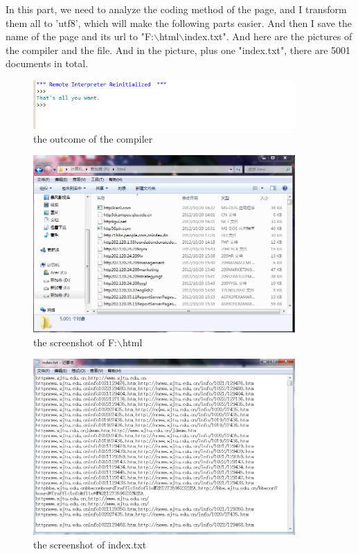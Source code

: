 \documentclass{article}
\begin{document}
In this part, we need to analyze the coding method of the page, and I transform them all to 'utf8', which will make the following parts easier. And then I save the name of the page and its url to "F:$\backslash$html$\backslash$index.txt". And here are the pictures of the compiler and the file. And in the picture, plus one "index.txt", there are 5001 documents in total.\\
\begin{figure}[htbp]
\centering
\includegraphics[width=10cm]{1.png}
\caption{the outcome of the compiler}
\end{figure}
\begin{figure}[htbp]
\centering
\includegraphics[width=10cm]{2.png}
\caption{the screenshot of F:$\backslash$html}
\end{figure}
\begin{figure}[htbp]
\centering
\includegraphics[width=10cm]{11.png}
\caption{the screenshot of index.txt}
\end{figure}
\end{document}
